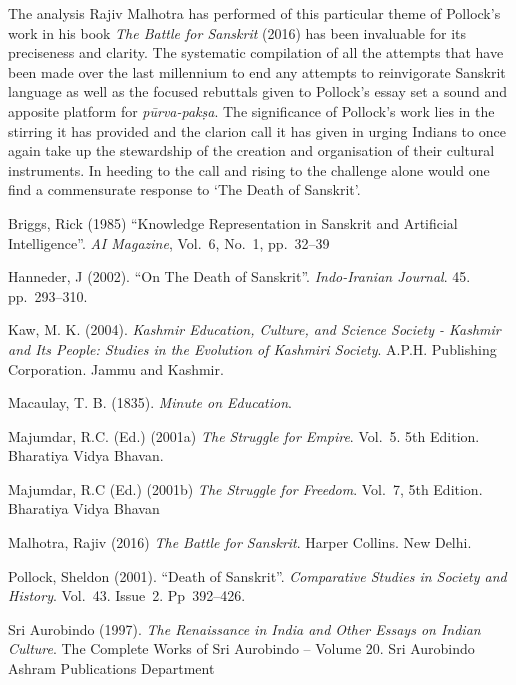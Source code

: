The analysis Rajiv Malhotra has performed of this particular theme of Pollock’s work in his book {\sl The Battle for Sanskrit} (2016) has been invaluable for its preciseness and clarity. The systematic compilation of all the attempts that have been made over the last millennium to end any attempts to reinvigorate Sanskrit language as well as the focused rebuttals given to Pollock’s essay set a sound and apposite platform for {\sl pūrva-pakṣa}. The significance of Pollock’s work lies in the stirring it has provided and the clarion call it has given in urging Indians to once again take up the stewardship of the creation and organisation of their cultural instruments. In heeding to the call and rising to the challenge alone would one find a commensurate response to ‘The Death of Sanskrit’.
\newpage

\begin{thebibliography}{99}
Briggs, Rick (1985) “Knowledge Representation in Sanskrit and Artificial Intelligence”. {\sl AI Magazine}, Vol.~6, No.~1, pp.~32--39

Hanneder, J (2002). “On The Death of Sanskrit”. {\sl Indo-Iranian Journal}. 45. pp.~293--310.

Kaw, M. K. (2004). {\sl Kashmir Education, Culture, and Science Society - Kashmir and Its People: Studies in the Evolution of Kashmiri Society}. A.P.H. 
Publishing Corporation. Jammu and Kashmir.  

Macaulay, T. B. (1835). {\sl Minute on Education}.

Majumdar, R.C. (Ed.) (2001a) {\sl The Struggle for Empire}. Vol.~5. 5th Edition. Bharatiya Vidya Bhavan. 

Majumdar, R.C (Ed.) (2001b) {\sl The Struggle for Freedom}. Vol.~7, 5th Edition. Bharatiya Vidya Bhavan

Malhotra, Rajiv (2016) {\sl The Battle for Sanskrit}. Harper Collins. New Delhi.

Pollock, Sheldon (2001). “Death of Sanskrit”. {\sl Comparative Studies in Society and History}. Vol.~43. Issue~2. Pp~392--426. 

Sri Aurobindo (1997). {\sl The Renaissance in India and Other Essays on Indian Culture}. The Complete Works of Sri Aurobindo – Volume 20. Sri Aurobindo 
Ashram Publications Department

\end{thebibliography}
